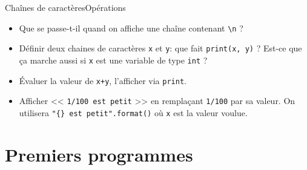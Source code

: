 \begin{frame}[fragile]{Chaînes de caractères}{Opérations}


	\begin{exo}
    \begin{itemize}[<+->]
	
	
	\item Que se passe-t-il quand on affiche une chaîne contenant \lstinline|\n| ?
	
	\item Définir deux chaines de caractères \lstinline|x| et \lstinline|y|: que fait \lstinline|print(x, y)| ? Est-ce que ça marche aussi si \lstinline|x| est une variable de type \lstinline|int| ?
	
	\item Évaluer la valeur de \lstinline|x+y|, l'afficher via \lstinline|print|.
	
	\item Afficher << \lstinline|1/100 est petit| >> en remplaçant \lstinline|1/100| par sa valeur. On utilisera \lstinline|"{} est petit".format()| où \lstinline|x| est la valeur voulue.
	
	\end{itemize}
	\end{exo}
\end{frame}

\section{Premiers programmes}

